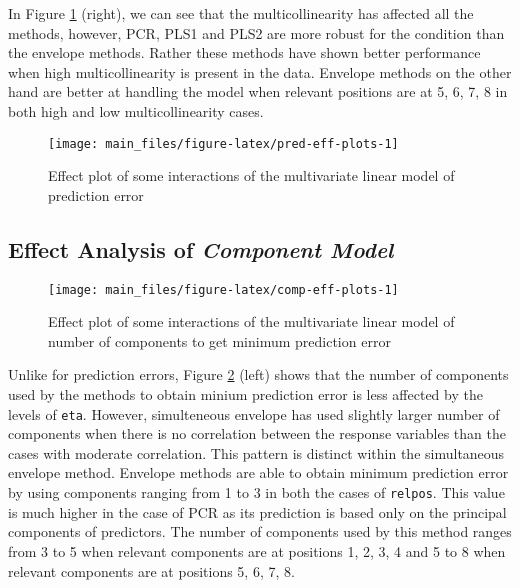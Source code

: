 \documentclass[12pt,3p,authoryear]{elsarticle}
\begin{document}
In Figure \ref{fig:pred-eff-plots} (right), we can see that the
multicollinearity has affected all the methods, however, PCR, PLS1 and
PLS2 are more robust for the condition than the envelope methods. Rather
these methods have shown better performance when high multicollinearity
is present in the data. Envelope methods on the other hand are better at
handling the model when relevant positions are at 5, 6, 7, 8 in both
high and low multicollinearity cases.




\begin{figure}
\texttt{[image: main\_files/figure-latex/pred-eff-plots-1]} \caption{Effect plot of some interactions of the multivariate
linear model of prediction error}\label{fig:pred-eff-plots}
\end{figure}

\subsection{\texorpdfstring{Effect Analysis of \emph{Component
Model}}{Effect Analysis of Component Model}}\label{effect-analysis-of-component-model}




\begin{figure}[!htb]
\texttt{[image: main\_files/figure-latex/comp-eff-plots-1]} \caption{Effect plot of some interactions of the multivariate
linear model of number of components to get minimum prediction error}\label{fig:comp-eff-plots}
\end{figure}

Unlike for prediction errors, Figure \ref{fig:comp-eff-plots} (left)
shows that the number of components used by the methods to obtain minium
prediction error is less affected by the levels of \texttt{eta}.
However, simulteneous envelope has used slightly larger number of
components when there is no correlation between the response variables
than the cases with moderate correlation. This pattern is distinct
within the simultaneous envelope method. Envelope methods are able to
obtain minimum prediction error by using components ranging from 1 to 3
in both the cases of \texttt{relpos}. This value is much higher in the
case of PCR as its prediction is based only on the principal components
of predictors. The number of components used by this method ranges from
3 to 5 when relevant components are at positions 1, 2, 3, 4 and 5 to 8
when relevant components are at positions 5, 6, 7, 8.
\end{document}
